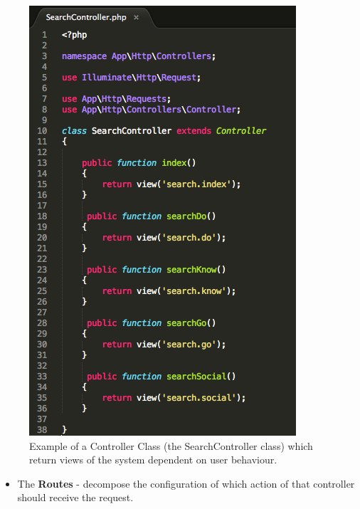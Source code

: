 \documentclass[a4paper, 11pt]{article}
\begin{document}
\begin{figure}[H]
\begin{center}
\includegraphics[scale=0.55]{controllers}
\caption{Example of a Controller Class (the SearchController class) which return views of the system dependent on user behaviour.}
\label{controller}
\end{center}
\end{figure}


\begin{itemize}
\item{The \textbf{Routes} - decompose the configuration of which action of that controller should receive the request.} 
\end{itemize}
\end{document}
